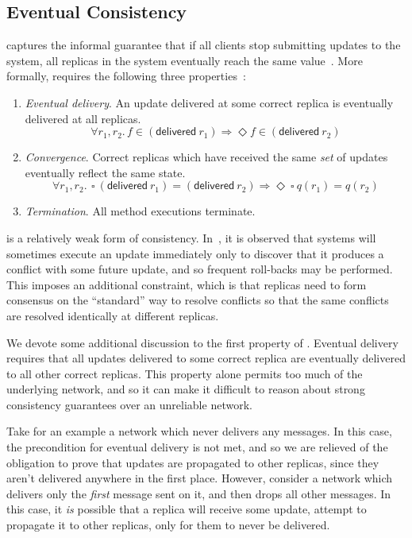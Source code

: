 \subsection{Eventual Consistency}
\EC captures the informal guarantee that if all clients stop submitting updates
to the system, all replicas in the system eventually reach the same
value~\citep{shapiro11}. More formally, \EC requires the following three
properties~\citep{shapiro11}:
\begin{enumerate}
  \item \emph{Eventual delivery}. An update delivered at some correct replica is
    eventually delivered at all replicas.
    \[
      \forall r_1, r_2.\, f \in (\textsf{delivered}~r_1) \Rightarrow \Diamond f
      \in (\textsf{delivered}~r_2)
    \]
  \item \emph{Convergence}. Correct replicas which have received the same
    \emph{set} of updates eventually reflect the same state.
    \[
      \forall r_1, r_2.\,~\square~(\textsf{delivered}~r_1) =
      (\textsf{delivered}~r_2) \Rightarrow \Diamond~\square~q(r_1) = q(r_2)
    \]
  \item \emph{Termination}. All method executions terminate.
\end{enumerate}

\EC is a relatively weak form of consistency. In~\citet{shapiro11}, it is
observed that \EC systems will sometimes execute an update immediately only to
discover that it produces a conflict with some future update, and so frequent
roll-backs may be performed. This imposes an additional constraint, which is
that replicas need to form consensus on the ``standard'' way to resolve
conflicts so that the same conflicts are resolved identically at different
replicas.

We devote some additional discussion to the first property of \EC. Eventual
delivery requires that all updates delivered to some correct replica are
eventually delivered to all other correct replicas. This property alone permits
too much of the underlying network, and so it can make it difficult to reason
about strong consistency guarantees over an unreliable network.

Take for an example a network which never delivers any messages. In this case,
the precondition for eventual delivery is not met, and so we are relieved of the
obligation to prove that updates are propagated to other replicas, since they
aren't delivered anywhere in the first place. However, consider a network which
delivers only the \emph{first} message sent on it, and then drops all other
messages. In this case, it \emph{is} possible that a replica will receive some
update, attempt to propagate it to other replicas, only for them to never be
delivered.

